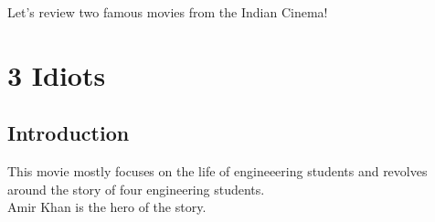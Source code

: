 \documentclass{article}
\begin{document}
Let's review two famous movies from the Indian Cinema!\\
\section{3 Idiots}

\subsection{Introduction}
This movie mostly focuses on the life of engineeering students and revolves around the story of four engineering students. \\
Amir Khan is the hero of the story. \\
\end{document}
